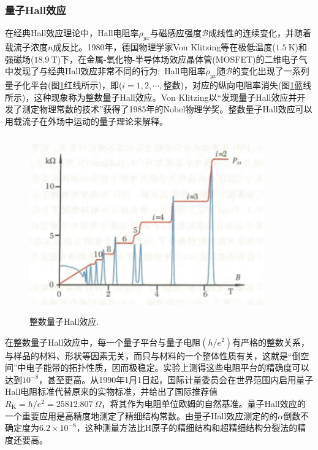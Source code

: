 \subsubsection{量子Hall效应} 
在经典Hall效应理论中，Hall电阻率$\rho_{yx}$与磁感应强度$\mathscr{B}$成线性的连续变化，并随着载流子浓度$n$成反比。1980年，德国物理学家Von Klitzing等在极低温度($1.5~\mathrm{K}$)和强磁场($18.9~\mathrm{T}$)下，在金属-氧化物-半导体场效应晶体管(MOSFET)的二维电子气中发现了与经典Hall效应非常不同的行为:~Hall电阻率$\rho_{yx}$随$\mathscr{B}$的变化出现了一系列量子化平台(图\ref{Fig:Quantum-Hall}红线所示)，即($i=1,2,\cdots,\mbox{整数}$)，对应的纵向电阻率消失(图\ref{Fig:Quantum-Hall}蓝线所示)，这种现象称为整数量子Hall效应。Von Klitzing以``发现量子Hall效应并开发了测定物理常数的技术''获得了1985年的Nobel物理学奖。整数量子Hall效应可以用载流子在外场中运动的量子理论来解释。
\begin{figure}[h!]
\centering
\vspace*{-0.10in}
\includegraphics[height=3.00in,width=4.00in,viewport=0 0 82 60,clip]{Figures/Quantum_Hall-integer.png}
\caption{\small \textrm{整数量子Hall效应.}}%
\label{Fig:Quantum-Hall}
\end{figure} 
在整数量子Hall效应中，每一个量子平台与量子电阻$(h/e^2)$有严格的整数关系，与样品的材料、形状等因素无关，而只与材料的一个整体性质有关，这就是``倒空间''中电子能带的拓扑性质，因而极稳定。实验上测得这些电阻平台的精确度可以达到$10^{-8}$，甚至更高。从1990年1月1日起，国际计量委员会在世界范围内启用量子Hall电阻标准代替原来的实物标准，并给出了国际推荐值$R_{\mathrm{K}}=h/e^2=25812.807~\Omega$，将其作为电阻单位欧姆的自然基准。量子Hall效应的一个重要应用是高精度地测定了精细结构常数。由量子Hall效应测定的的$\alpha$倒数不确定度为$6.2\times10^{-8}$，这种测量方法比H原子的精细结构和超精细结构分裂法的精度还要高。

